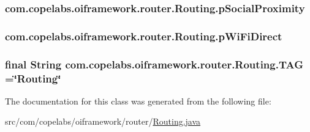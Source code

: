 \subsubsection[{p\+Social\+Proximity}]{ com.\+copelabs.\+oiframework.\+router.\+Routing.\+p\+Social\+Proximity\hspace{0.3cm}{\ttfamily [private]}}\label{classcom_1_1copelabs_1_1oiframework_1_1router_1_1_routing_a2d75c4e7f78ea50811f94541832a64d1}
\hypertarget{classcom_1_1copelabs_1_1oiframework_1_1router_1_1_routing_aa0ebfed6845783ed64cd90cce80d56e0}{}
\subsubsection[{p\+Wi\+Fi\+Direct}]{ com.\+copelabs.\+oiframework.\+router.\+Routing.\+p\+Wi\+Fi\+Direct\hspace{0.3cm}{\ttfamily [private]}}\label{classcom_1_1copelabs_1_1oiframework_1_1router_1_1_routing_aa0ebfed6845783ed64cd90cce80d56e0}
\hypertarget{classcom_1_1copelabs_1_1oiframework_1_1router_1_1_routing_a49b371c77210ef1dd565cc7c9217b046}{}
\subsubsection[{T\+A\+G}]{\setlength{\rightskip}{0pt plus 5cm}final String com.\+copelabs.\+oiframework.\+router.\+Routing.\+T\+A\+G =\char`\"{}Routing\char`\"{}\hspace{0.3cm}{\ttfamily [static]}}\label{classcom_1_1copelabs_1_1oiframework_1_1router_1_1_routing_a49b371c77210ef1dd565cc7c9217b046}


The documentation for this class was generated from the following file\+:\begin{DoxyCompactItemize}
\item 
src/com/copelabs/oiframework/router/\hyperlink{_routing_8java}{Routing.\+java}\end{DoxyCompactItemize}
